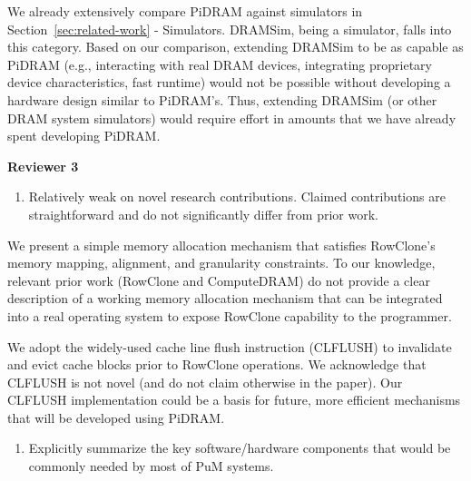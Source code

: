 We already extensively compare PiDRAM against simulators in Section~\ref{sec:related-work} - Simulators. DRAMSim, being a simulator, falls into this category. Based on our comparison, extending DRAMSim to be as capable as PiDRAM (e.g., interacting with real DRAM devices, integrating proprietary device characteristics, fast runtime) would not be possible without developing a hardware design similar to PiDRAM’s. Thus, extending DRAMSim (or other DRAM system simulators) would require effort in amounts that we have already spent developing PiDRAM.



\newpage

\noindent \textbf{\large{Reviewer 3}}

\bigbreak
\begin{tcolorbox}
    \begin{enumerate}[label=R3/\arabic*]
        \item \label{q:r3q1} Relatively weak on novel research contributions. Claimed contributions are straightforward and do not significantly differ from prior work.
    \end{enumerate}
\end{tcolorbox} 

We present a simple memory allocation mechanism that satisfies RowClone’s memory mapping, alignment, and granularity constraints. To our knowledge, relevant prior work (RowClone and ComputeDRAM) do not provide a clear description of a working memory allocation mechanism that can be integrated into a real operating system to expose RowClone capability to the programmer.

We adopt the widely-used cache line flush instruction (CLFLUSH) to invalidate and evict cache blocks prior to RowClone operations. We acknowledge that CLFLUSH is not novel (and do not claim otherwise in the paper). Our CLFLUSH implementation could be a basis for future, more efficient mechanisms that will be developed using PiDRAM.

\bigbreak
\begin{tcolorbox}
    \begin{enumerate}[label=R3/\arabic*]
        \addtocounter{enumi}{1}
        \item \label{q:r3q2} Explicitly summarize the key software/hardware components that would be commonly needed by most of PuM systems. 
    \end{enumerate}
\end{tcolorbox} 

